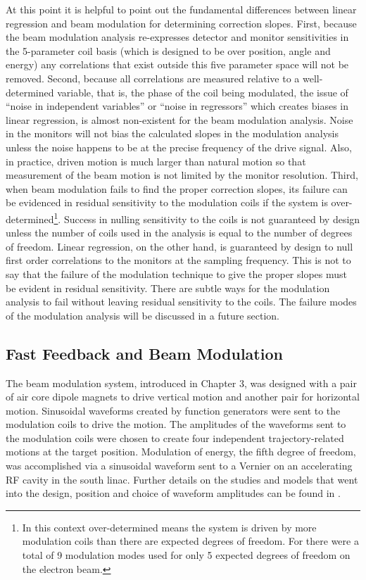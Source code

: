 At this point it is helpful to point out the fundamental differences between linear regression and beam modulation for determining correction slopes. First, because the beam modulation analysis re-expresses detector and monitor sensitivities in the 5-parameter coil basis (which is designed to be over position, angle and energy) any correlations that exist outside this five parameter space will not be removed. Second, because all correlations are measured relative to a well-determined variable, that is, the phase of the coil being modulated, the issue of ``noise in independent variables'' or ``noise in regressors'' which creates biases in linear regression, is almost non-existent for the beam modulation analysis. Noise in the monitors will not bias the calculated slopes in the modulation analysis unless the noise happens to be at the precise frequency of the drive signal. Also, in practice, driven motion is much larger than natural motion so that measurement of the beam motion is not limited by the monitor resolution. Third, when beam modulation fails to find the proper correction slopes, its failure can be evidenced in residual sensitivity to the modulation coils if the system is over-determined\footnote{In this context over-determined means the system is driven by more modulation coils than there are expected degrees of freedom. For \Qs there were a total of 9 modulation modes used for only 5 expected degrees of freedom on the electron beam.}. Success in nulling sensitivity to the coils is not guaranteed by design unless the number of coils used in the analysis is equal to the number of degrees of freedom. Linear regression, on the other hand, is guaranteed by design to null first order correlations to the monitors at the sampling frequency. This is not to say that the failure of the modulation technique to give the proper slopes must be evident in residual sensitivity. There are subtle ways for the modulation analysis to fail without leaving residual sensitivity to the coils. The failure modes of the modulation analysis will be discussed in a future section. 

\subsection{Fast Feedback and Beam Modulation}
The beam modulation system, introduced in Chapter 3, was designed with a pair of air core dipole magnets to drive vertical motion and another pair for horizontal motion.  Sinusoidal waveforms created by function generators were sent to the modulation coils to drive the motion. The amplitudes of the waveforms sent to the  modulation coils were chosen to create four independent trajectory-related motions at the target position. Modulation of energy, the fifth degree of freedom, was accomplished via a sinusoidal waveform sent to a Vernier on an accelerating RF cavity in the south linac. Further details on the studies and models that went into the design, position and choice of waveform amplitudes can be found in \cite{Nur}.

